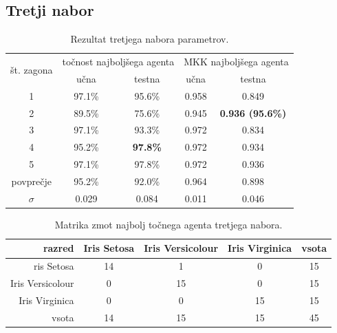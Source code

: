 \subsection{Tretji nabor}\label{subsec:dodatek-iris-tretji-nabor}
\begin{table}[H]
    \begin{center}
        \begin{tabular}{|| c | c c || c c ||}
            \hline
            \multirow{2}{*}{št. zagona} & \multicolumn{2}{c||}{točnost najboljšega agenta} & \multicolumn{2}{c||}{MKK najboljšega agenta} \\ \cline{2-5}
            & učna   & testna          & učna  & testna                  \\
            \hline
            1         & 97.1\% & 95.6\%          & 0.958 & 0.849                   \\
            \hline
            2         & 89.5\% & 75.6\%          & 0.945 & \textbf{0.936 (95.6\%)} \\
            \hline
            3         & 97.1\% & 93.3\%          & 0.972 & 0.834                   \\
            \hline
            4         & 95.2\% & \textbf{97.8\%} & 0.972 & 0.934                   \\
            \hline
            5         & 97.1\% & 97.8\%          & 0.972 & 0.936                   \\
            \hline
            povprečje & 95.2\% & 92.0\%          & 0.964 & 0.898                   \\
            \hline
            $\sigma$  & 0.029  & 0.084           & 0.011 & 0.046                   \\
            \hline
        \end{tabular}
    \end{center}
    \caption{Rezultat tretjega nabora parametrov.}
    \label{tab:iris_result_3}
\end{table}

\begin{table}[H]
    \centering
    \begin{tabular}{||rcccc||}
        \hline
        razred           & Iris Setosa & Iris Versicolour & Iris Virginica & vsota \\ \hline
        ris Setosa       & 14          & 1                & 0              & 15    \\ \hline
        Iris Versicolour & 0           & 15               & 0              & 15    \\ \hline
        Iris Virginica   & 0           & 0                & 15             & 15    \\ \hline
        vsota            & 14          & 15               & 15             & 45    \\ \hline
    \end{tabular}
    \caption{Matrika zmot najbolj točnega agenta tretjega nabora.}
    \label{tab:iris_acc_3}
\end{table}

